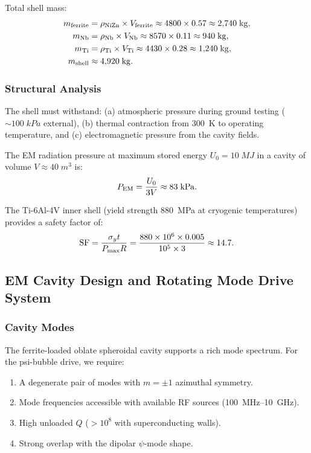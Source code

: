 \documentclass[twocolumn,prl,superscriptaddress,nofootinbib,longbibliography,floatfix]{revtex4-2}
\begin{document}
Total shell mass:
\begin{align}
m_{\rm ferrite} &= \rho_{\rm NiZn} \times V_{\rm ferrite}
\approx 4800 \times 0.57 \approx 2{,}740\;\si{kg},
\label{eq:m-ferrite}\\
m_{\rm Nb} &= \rho_{\rm Nb} \times V_{\rm Nb}
\approx 8570 \times 0.11 \approx 940\;\si{kg},
\label{eq:m-Nb}\\
m_{\rm Ti} &= \rho_{\rm Ti} \times V_{\rm Ti}
\approx 4430 \times 0.28 \approx 1{,}240\;\si{kg},
\label{eq:m-Ti}\\
m_{\rm shell} &\approx 4{,}920\;\si{kg}.
\label{eq:m-shell}
\end{align}

\subsubsection{Structural Analysis}

The shell must withstand: (a) atmospheric pressure during ground testing
($\sim 100\;\si{kPa}$ external), (b) thermal contraction from 300~K to
operating temperature, and (c) electromagnetic pressure from the cavity
fields.

The EM radiation pressure at maximum stored energy $U_0 = 10\;\si{MJ}$
in a cavity of volume $V \approx 40\;\si{m^3}$ is:
\begin{equation}
P_{\rm EM} = \frac{U_0}{3V} \approx 83\;\si{kPa}.
\label{eq:P-EM}
\end{equation}

The Ti-6Al-4V inner shell (yield strength 880~MPa at cryogenic
temperatures) provides a safety factor of:
\begin{equation}
\text{SF} = \frac{\sigma_y t}{P_{\rm max} R}
= \frac{880 \times 10^6 \times 0.005}{10^5 \times 3}
\approx 14.7.
\label{eq:safety-factor}
\end{equation}

\subsection{EM Cavity Design and Rotating Mode Drive System}

\subsubsection{Cavity Modes}

The ferrite-loaded oblate spheroidal cavity supports a rich mode
spectrum.  For the psi-bubble drive, we require:
\begin{enumerate}[nosep]
\item A degenerate pair of modes with $m = \pm 1$ azimuthal symmetry.
\item Mode frequencies accessible with available RF sources
(100~MHz--10~GHz).
\item High unloaded $Q$ ($> 10^8$ with superconducting walls).
\item Strong overlap with the dipolar $\psi$-mode shape.
\end{enumerate}
\end{document}
